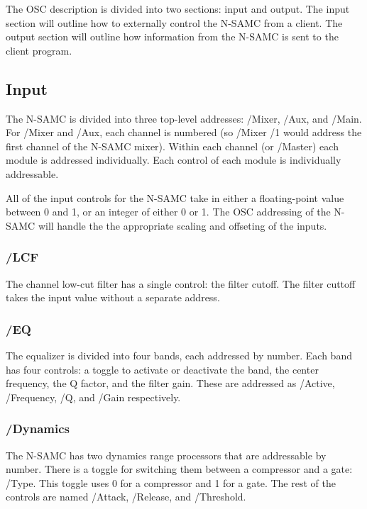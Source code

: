 \documentclass[letterpaper, 12pt, twosided, twocolumn]{article}
\begin{document}
The OSC description is divided into two sections: input and output. The input section will outline how to externally control the N-SAMC from a client. The output section will outline how information from the N-SAMC is sent to the client program.

\subsection{Input}

The N-SAMC is divided into three top-level addresses: /Mixer, /Aux, and /Main. For /Mixer and /Aux, each channel is numbered (so /Mixer /1 would address the first channel of the N-SAMC mixer). Within each channel (or /Master) each module is addressed individually. Each control of each module is individually addressable. 

All of the input controls for the N-SAMC take in either a floating-point value between 0 and 1, or an integer of either 0 or 1. The OSC addressing of the N-SAMC will handle the the appropriate scaling and offseting of the inputs.

\subsubsection{/LCF}

The channel low-cut filter has a single control: the filter cutoff. The filter cuttoff takes the input value without a separate address.

\subsubsection{/EQ}

The equalizer is divided into four bands, each addressed by number. Each band has four controls: a toggle to activate or deactivate the band, the center frequency, the Q factor, and the filter gain. These are addressed as /Active, /Frequency, /Q, and /Gain respectively.

\subsubsection{/Dynamics}

The N-SAMC has two dynamics range processors that are addressable by number. There is a toggle for switching them between a compressor and a gate: /Type. This toggle uses 0 for a compressor and 1 for a gate. The rest of the controls are named /Attack, /Release, and /Threshold.
\end{document}
